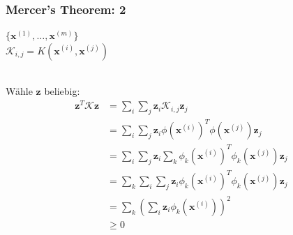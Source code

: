 	\begin{frame}
		\frametitle{Mercer's Theorem: 2}
			$\{ \boldsymbol{x}^{(1)}, \dots, \boldsymbol{x}^{(m)} \}$ \\
			$\mathcal{K}_{i,j} = K(\boldsymbol{x}^{(i)}, \boldsymbol{x}^{(j)})$ \\\
			
			Wähle $\boldsymbol{z}$ beliebig:
			\begin{align*}
				\boldsymbol{z}^{T} \mathcal{K} \boldsymbol{z} &= \sum_{i} \sum_{j} \boldsymbol{z}_{i} \mathcal{K}_{i,j} \boldsymbol{z}_{j} \\
															  &= \sum_{i} \sum_{j} \boldsymbol{z}_{i} \phi(\boldsymbol{x}^{(i)})^{T} \phi(\boldsymbol{x}^{(j)}) \boldsymbol{z}_{j} \\
															  &= \sum_{i} \sum_{j} \boldsymbol{z}_{i} \sum_{k} \phi_{k}(\boldsymbol{x}^{(i)})^{T} \phi_{k}(\boldsymbol{x}^{(j)}) \boldsymbol{z}_{j} \\
															  &= \sum_{k} \sum_{i} \sum_{j} \boldsymbol{z}_{i} \phi_{k}(\boldsymbol{x}^{(i)})^{T} \phi_{k}(\boldsymbol{x}^{(j)}) \boldsymbol{z}_{j} \\
															  &= \sum_{k} \left( \sum_{i} \boldsymbol{z}_{i} \phi_{k}(\boldsymbol{x}^{(i)}) \right)^{2} \\
															  &\ge 0 \\
			\end{align*}
	\end{frame}
	
